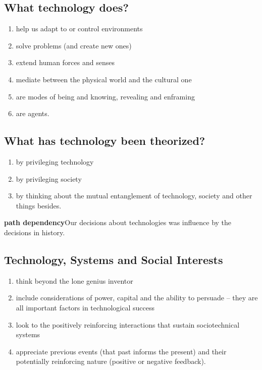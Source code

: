 \documentclass[18pt]{article}
\begin{document}
\subsection{What technology does?}
\begin{enumerate}
    \item help us adapt to or control environments
    \item solve problems (and create new ones)
    \item extend human forces and senses
    \item mediate between the physical world and the cultural one
    \item are modes of being and knowing, revealing and enframing
    \item are agents.
\end{enumerate}

\subsection{What has technology been theorized?}
\begin{enumerate}
    \item by privileging technology
    \item by privileging society
    \item by thinking about the mutual entanglement of technology, society and other things besides.
\end{enumerate}

\textbf{path dependency}Our decisions about technologies was influence by the decisions in history.
\subsection{Technology, Systems and Social Interests}
\begin{enumerate}
    \item think beyond the lone genius inventor
    \item include considerations of power, capital and the ability to persuade – they are all important factors in technological success
    \item look to the positively reinforcing interactions that sustain sociotechnical systems
    \item appreciate previous events (that past informs the present) and their potentially reinforcing nature (positive or negative feedback).
\end{enumerate}
\end{document}
